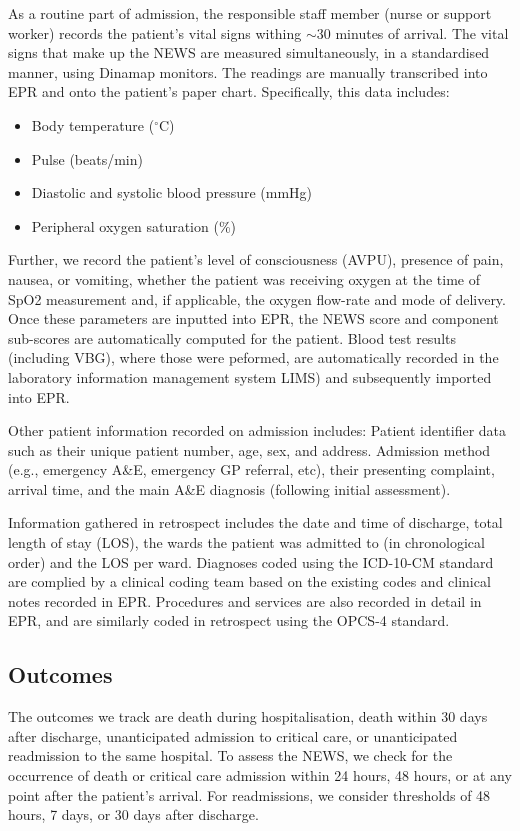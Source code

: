 \documentclass[10pt,journal,compsoc]{IEEEtran}
\begin{document}
As a routine part of admission, the responsible staff member (nurse or support worker) records the patient's vital signs withing $\sim 30$ minutes of arrival. The vital signs that make up the NEWS are measured simultaneously, in a standardised manner, using Dinamap monitors. The readings are manually transcribed into EPR and onto the patient's paper chart. Specifically, this data includes:
\begin{itemize}
    \item Body temperature ($^{\circ}$C)
    \item Pulse (beats/min)
    \item Diastolic and systolic blood pressure (mmHg)
    \item Peripheral oxygen saturation (\%)
\end{itemize}
Further, we record the patient's level of consciousness (AVPU), presence of pain, nausea, or vomiting, whether the patient was receiving oxygen at the time of SpO2 measurement and, if applicable, the oxygen flow-rate and mode of delivery. Once these parameters are inputted into EPR, the NEWS score and component sub-scores are automatically computed for the patient. Blood test results (including VBG), where those were peformed, are automatically recorded in the laboratory information management system LIMS) and subsequently imported into EPR.

Other patient information recorded on admission includes: Patient identifier data such as their unique patient number, age, sex, and address. Admission method (e.g., emergency A\&E, emergency GP referral, etc), their presenting complaint, arrival time, and the main A\&E diagnosis (following initial assessment).

Information gathered in retrospect includes the date and time of discharge, total length of stay (LOS), the wards the patient was admitted to (in chronological order) and the LOS per ward. Diagnoses coded using the ICD-10-CM standard are complied by a clinical coding team based on the existing codes and clinical notes recorded in EPR. Procedures and services are also recorded in detail in EPR, and are similarly coded in retrospect using the OPCS-4 standard.

\subsection{Outcomes} The outcomes we track are death during hospitalisation, death within 30 days after discharge, unanticipated admission to critical care, or unanticipated readmission to the same hospital. To assess the NEWS, we check for the occurrence of death or critical care admission within 24 hours, 48 hours, or at any point after the patient's arrival. For readmissions, we consider thresholds of 48 hours, 7 days, or 30 days after discharge.
\end{document}
